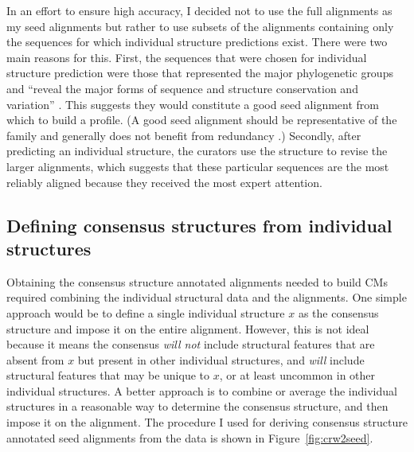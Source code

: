 In an effort to ensure high accuracy, I decided not to
use the full  alignments as my seed alignments but rather to use
subsets of the alignments containing only the sequences for which
individual structure predictions exist.  There were two main reasons
for this. First, the sequences that were chosen for individual
structure prediction were those that represented the major
phylogenetic groups and ``reveal the major forms of sequence and
structure conservation and variation'' \cite{CannoneGutell02}. This
suggests they would constitute a good seed alignment from which to
build a profile. (A good seed alignment should be representative of
the family and generally does not benefit from redundancy
\cite{Durbin98}.) Secondly, after predicting an individual structure,
the  curators use the structure to revise the larger alignments,
which suggests that these particular sequences are the most reliably
aligned because they received the most expert attention.

\subsection{Defining consensus structures from individual structures}

Obtaining the consensus structure annotated alignments needed to build
CMs required combining the individual structural data and the
alignments. One simple approach would be to define a single individual
structure $x$ as the consensus structure and impose it on the entire
alignment. However, this is not ideal because it means the consensus
\emph{will not} include structural features that are absent from $x$
but present in other individual structures, and \emph{will} include
structural features that may be unique to $x$, or at least uncommon in
other individual structures. A better approach is to combine or
average the individual structures in a reasonable way to determine the
consensus structure, and then impose it on the alignment. The
procedure I used for deriving consensus structure annotated seed
alignments from the  data is shown in Figure~\ref{fig:crw2seed}.

